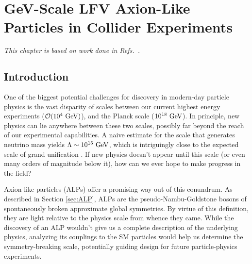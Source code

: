 \chapter{GeV-Scale LFV Axion-Like Particles in Collider Experiments}
\label{alp_collider}


\vspace{-1cm}
\begin{center}
{\it This chapter is based on work done in Refs.~\cite{Davoudiasl:2021haa,Davoudiasl:2021mjy,Davoudiasl:2024vje,Batell:2024cdl}.}
\end{center}
\vspace{1cm}


\section{Introduction}

One of the biggest potential challenges for discovery in modern-day particle physics is the vast disparity of scales between our current highest energy experiments (${\cal O}(10^4~{\rm GeV})$), and the Planck scale ($10^{18}~{\rm GeV}$). In principle, new physics can lie anywhere between these two scales, possibly far beyond the reach of our experimental capabilities. A naive estimate for the scale that generates neutrino mass yields $\Lambda \sim 10^{15}~{\rm GeV}$, which is intriguingly close to the expected scale of grand unification \cite{Mohapatra:2004fj}. If new physics doesn't appear until this scale (or even many orders of magnitude below it), how can we ever hope to make progress in the field?

Axion-like particles (ALPs) offer a promising way out of this conundrum. As described in Section \ref{sec:ALP}, ALPs are the pseudo-Nambu-Goldstone bosons of spontaneously broken approximate global symmetries. By virtue of this definition, they are light relative to the physics scale from whence they came. While the discovery of an ALP wouldn't give us a complete description of the underlying physics, analyzing its couplings to the SM particles would help us determine the symmetry-breaking scale, potentially guiding design for future particle-physics experiments. 

